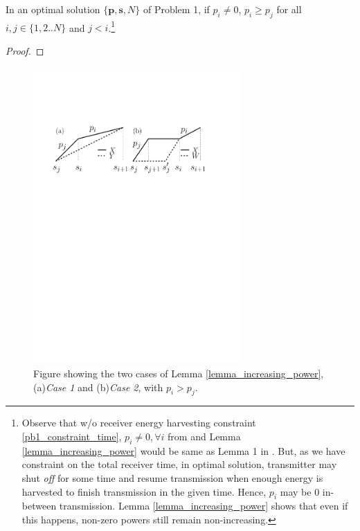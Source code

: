 
\begin{lemma}
In an optimal solution $\{\bm{p},\bm{s},N\}$ of Problem 1, if $p_i\neq 0$, $p_i\ge p_j$ for all $i,j\in \{1,2..N\}$ and $j<i$.\footnote{\label{note1}Observe that w/o receiver energy harvesting constraint \eqref{pb1_constraint_time}, $p_i\neq 0,\forall i$ from \cite{Yang} and Lemma \ref{lemma_increasing_power} would be same as Lemma 1 in \cite{Yang}. But, as we have constraint on the total receiver time, in optimal solution, transmitter may shut \textit{off} for some time and resume transmission when enough energy is harvested to finish transmission in the given time. Hence, $p_i$ may be $0$ in-between transmission. Lemma \ref{lemma_increasing_power} shows that even if this happens, non-zero powers still remain non-increasing.}  
\label{lemma_increasing_power}
\end{lemma}
\begin{proof}

\end{proof}

\begin{figure}[htb]
  \centering
  \centerline{\includegraphics[width=8cm]{Lemma1.pdf}}
\caption{Figure showing the two cases of Lemma \ref{lemma_increasing_power}, (a)\textit{Case 1}   and (b)\textit{Case 2}, with $p_i>p_j$.}\label{Lemma1}
\end{figure}

